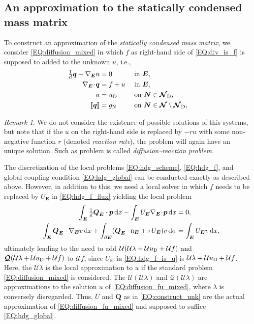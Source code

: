 \documentclass[a4paper, english, 12pt, reqno, draft]{amsart}
\theoremstyle{definition}
\theoremstyle{remark}
\newtheorem{remark}[theorem]{Remark}
\numberwithin{equation}{section}
\newcommand{\SetNode}{\ensuremath{\boldsymbol{\mathcal N}}}
\newcommand{\SetNodeDir}{\ensuremath{\SetNode_\textup D}}
\newcommand{\Edge}{{\ensuremath{\boldsymbol E}}}
\newcommand{\Node}{{\ensuremath{\boldsymbol N}}}
\newcommand{\Nabla}{\ensuremath{\nabla_\Edge}}
\newcommand{\Div}{\ensuremath{\Nabla\!\cdot\!}}
\newcommand{\Normal}{\ensuremath{\mathfrak n_\Edge}}
\newcommand{\jump}[1]{{[\![ #1 ]\!]}}
\renewcommand{\vec}[1]{\ensuremath{\boldsymbol{#1}}}
\newcommand{\dx}{\ensuremath{\, \textup d x}}
\newcommand{\ds}{\ensuremath{\, \textup d \sigma}}
\newcommand{\localU}{\ensuremath{\mathcal U}}
\newcommand{\localQ}{\ensuremath{\vec{\mathcal Q}}}
\begin{document}
\subsection{An approximation to the statically condensed mass matrix}\label{SEC:approx_mass}
% 
To construct an approximation of the \emph{statically condensed mass matrix}, we consider \eqref{EQ:diffusion_mixed} in which $f$ as right-hand side of \eqref{EQ:div_is_f} is supposed to added to the unknown $u$, i.e.,
% 
\begin{subequations}\label{EQ:diffusion_fu_mixed}
\begin{align}
 \tfrac{1}{d} \vec q + \Nabla u & = 0 && \text{ in } \Edge,\label{EQ:primal_dual_fu}\\
 \Div \vec q & = f + u && \text{ in } \Edge,\label{EQ:div_is_u}\\
  u & = u_\textup D && \text{ on } \Node \in \SetNodeDir,\label{EQ:dir_cond_fu}\\
 \jump{\vec q} & = g_\textup N && \text{ on } \Node \in \SetNode \setminus \SetNodeDir,\label{EQ:neu_cond_fu}
\end{align}
\end{subequations}
% 
\begin{remark}\label{REM:ex_reaction}
 We do not consider the existence of possible solutions of this systems, but note that if the $u$ on the right-hand side is replaced by $- ru$ with some non-negative function $r$ (denoted \emph{reaction rate}), the problem will again have an unique solution. Such as problem is called \emph{diffusion--reaction problem}.
\end{remark}
% 
The discretization of the local problems \eqref{EQ:hdg_scheme}, \eqref{EQ:hdg_f}, and global coupling condition \eqref{EQ:hdg_global} can be conducted exactly as described above. However, in addition to this, we need a local solver in which $f$ needs to be replaced by $U_\Edge$ in \eqref{EQ:hdg_f_flux} yielding the local problem
% 
\begin{subequations}\label{EQ:hdg_f_is_u}
 \begin{align}
  \int_\Edge \tfrac{1}{d} \vec Q_\Edge \cdot \vec p \dx - \int_\Edge U_\Edge \Div \vec p \dx & = 0, \label{EQ:hdg_fu_primary}\\
  - \int_\Edge \vec Q_\Edge \cdot \Nabla v \dx  + \int_{\partial \Edge} ( \vec Q_\Edge \cdot \Normal + \tau U_\Edge ) v \ds & =  \int_{\Edge} U_\Edge v \dx,\label{EQ:hdg_fu_flux}
 \end{align}
\end{subequations}
% 
ultimately leading to the need to add $\localU (\localU \lambda + \localU u_\text D + \localU f)$ and $\localQ (\localU \lambda + \localU u_\text D + \localU f)$ to $\localU f$, since $U_\Edge$ in \eqref{EQ:hdg_f_is_u} is $\localU \lambda + \localU u_\text D + \localU f$. Here, the $\localU \lambda$ is the local approximation to $u$ if the standard problem \eqref{EQ:diffusion_mixed} is considered. The $\localU (\localU \lambda)$ and $\localQ (\localU \lambda)$ are approximations to the solution $u$ of \eqref{EQ:diffusion_fu_mixed}, where $\lambda$ is conversely disregarded. Thus, $U$ and $\vec Q$ as in \eqref{EQ:construct_unk} are the actual approximation of \eqref{EQ:diffusion_fu_mixed} and supposed to suffice \eqref{EQ:hdg_global}.
\end{document}

